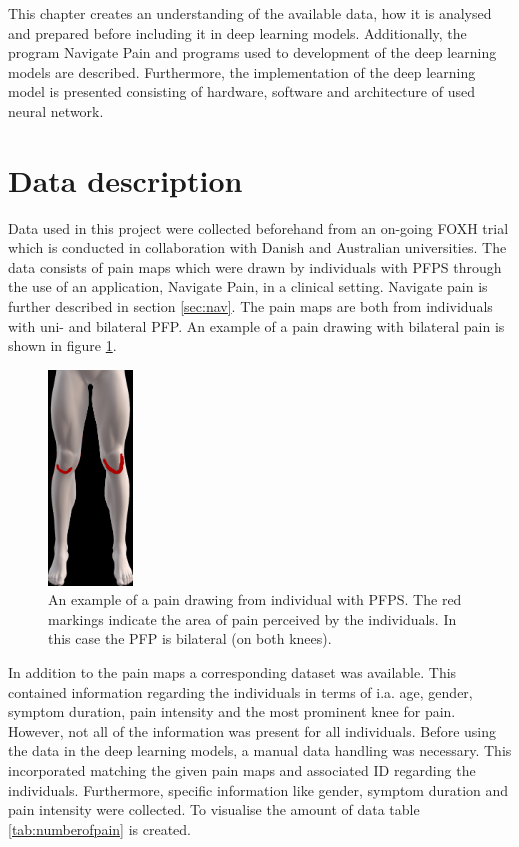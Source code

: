 This chapter creates an understanding of the available data, how it is analysed and prepared before including it in deep learning models. Additionally, the program Navigate Pain and programs used to development of the deep learning models are described. Furthermore, the implementation of the deep learning model is presented consisting of hardware, software and architecture of used neural network.

\section{Data description}
Data used in this project were collected beforehand from an on-going FOXH trial which is conducted in collaboration with Danish and Australian universities. The data consists of pain maps which were drawn by individuals with PFPS through the use of an application, Navigate Pain, in a clinical setting. Navigate pain is further described in section \ref{sec:nav}. The pain maps are both from individuals with uni- and bilateral PFP. An example of a pain drawing with bilateral pain is shown in figure \ref{fig:kneepainmap}.

\begin{figure} [H]
\centering
\includegraphics[width=0.2\textwidth]{figures/kneepainmap}
\caption{An example of a pain drawing from individual with PFPS. The red markings indicate the area of pain perceived by the individuals. In this case the PFP is bilateral (on both knees).}
\label{fig:kneepainmap}
\end{figure}

\noindent
In addition to the pain maps a corresponding dataset was available. This contained information regarding the individuals in terms of i.a. age, gender, symptom duration, pain intensity and the most prominent knee for pain. However, not all of the information was present for all individuals.
Before using the data in the deep learning models, a manual data handling was necessary. This incorporated matching the given pain maps and associated ID regarding the individuals. Furthermore, specific information like gender, symptom duration and pain intensity were collected. To visualise the amount of data table \ref{tab:numberofpain} is created.

